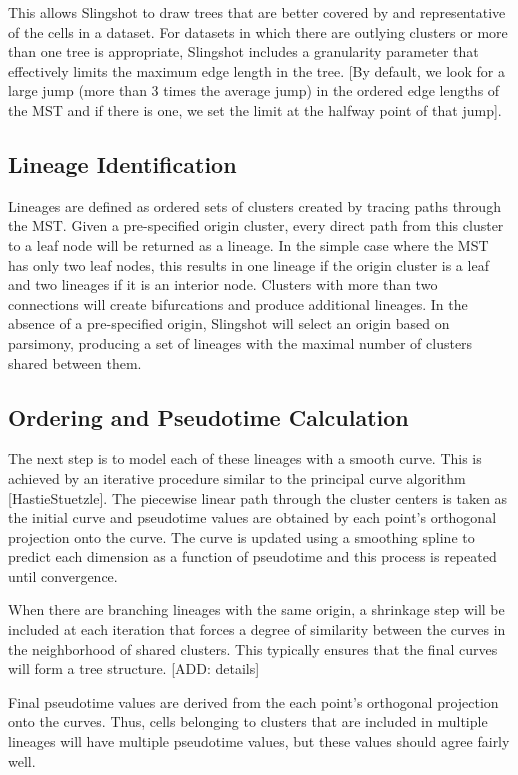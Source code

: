 \documentclass[11pt]{article}\usepackage[]{graphicx}\usepackage[]{color}
\begin{document}
This allows Slingshot to draw trees that are better covered by and representative of the cells in a dataset. For datasets in which there are outlying clusters or more than one tree is appropriate, Slingshot includes a granularity parameter that effectively limits the maximum edge length in the tree. [By default, we look for a large jump (more than 3 times the average jump) in the ordered edge lengths of the MST and if there is one, we set the limit at the halfway point of that jump]. 

\subsection{Lineage Identification}
Lineages are defined as ordered sets of clusters created by tracing paths through the MST. Given a pre-specified origin cluster, every direct path from this cluster to a leaf node will be returned as a lineage. In the simple case where the MST has only two leaf nodes, this results in one lineage if the origin cluster is a leaf and two lineages if it is an interior node. Clusters with more than two connections will create bifurcations and produce additional lineages. In the absence of a pre-specified origin, Slingshot will select an origin based on parsimony, producing a set of lineages with the maximal number of clusters shared between them.

\subsection{Ordering and Pseudotime Calculation}
The next step is to model each of these lineages with a smooth curve. This is achieved by an iterative procedure similar to the principal curve algorithm [HastieStuetzle]. The piecewise linear path through the cluster centers is taken as the initial curve and pseudotime values are obtained by each point’s orthogonal projection onto the curve. The curve is updated using a smoothing spline to predict each dimension as a function of pseudotime and this process is repeated until convergence.

When there are branching lineages with the same origin, a shrinkage step will be included at each iteration that forces a degree of similarity between the curves in the neighborhood of shared clusters. This typically ensures that the final curves will form a tree structure. [ADD: details]

Final pseudotime values are derived from the each point’s orthogonal projection onto the curves. Thus, cells belonging to clusters that are included in multiple lineages will have multiple pseudotime values, but these values should agree fairly well.
\end{document}
